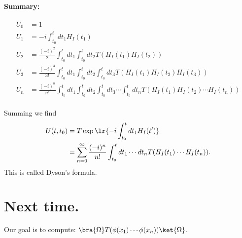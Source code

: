 \paragraph{Summary:}
\begin{equation}\label{eqn:qftLecture13:1120}
\begin{aligned}
U_0 &= 1 \\
U_1 &= -i \int_{t_0}^t dt_1 H_I(t_1) \\
U_2 &= \frac{(-i)^2}{2}
\int_{t_0}^t dt_1
\int_{t_0}^t dt_2
T( H_I(t_1)
H_I(t_2) ) \\
U_3 &= \frac{(-i)^3}{3!}
\int_{t_0}^t dt_1
\int_{t_0}^t dt_2
\int_{t_0}^t dt_3
T( H_I(t_1)
H_I(t_2)
H_I(t_3)
) \\
U_n &= \frac{(-i)^n}{n!}
\int_{t_0}^t dt_1
\int_{t_0}^t dt_2
\int_{t_0}^t dt_3
\cdots
\int_{t_0}^t dt_n
T( H_I(t_1)
H_I(t_2)
\cdots
H_I(t_n)
) \\
\end{aligned}
\end{equation}

Summing we find
\begin{equation}\label{eqn:qftLecture13:1140}
\begin{aligned}
U(t, t_0) 
&= T \exp\lr{-i
\int_{t_0}^t dt_1 H_I(t')
}
\\&=
\sum_{n = 0}^\infty
\frac{(-i)^n}{n!} \int_{t_0}^t dt_1 \cdots dt_n T( H_I(t_1) \cdots H_I(t_n) ).
\end{aligned}
\end{equation}
This is called Dyson's formula.
\section{Next time.}
Our goal is to compute: \( \bra{\Omega} T(\phi(x_1) \cdots \phi(x_n)) \ket{\Omega} \).
